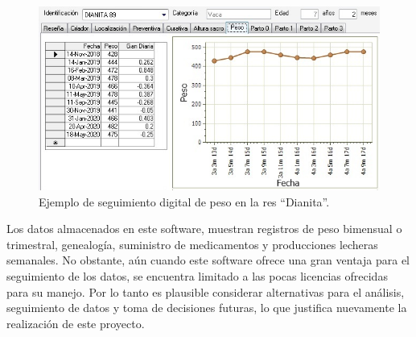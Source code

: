 \begin{figure}[H]
	 \begin{center}
	 \includegraphics[scale=0.92]{img/ejpesos.jpg}
	 \end{center}
	 \caption{Ejemplo de seguimiento digital de peso en la res ``Dianita''. \label{ejpesos}}
\end{figure}

Los datos almacenados en este software, muestran registros de peso bimensual o trimestral, genealogía, suministro de medicamentos y producciones lecheras semanales.
No obstante, aún cuando este software ofrece una gran ventaja para el seguimiento de los datos, se encuentra limitado a las pocas licencias ofrecidas para su manejo. Por lo tanto es plausible considerar alternativas para el análisis, seguimiento de datos y toma de decisiones futuras, lo que justifica nuevamente la realización de este proyecto.
